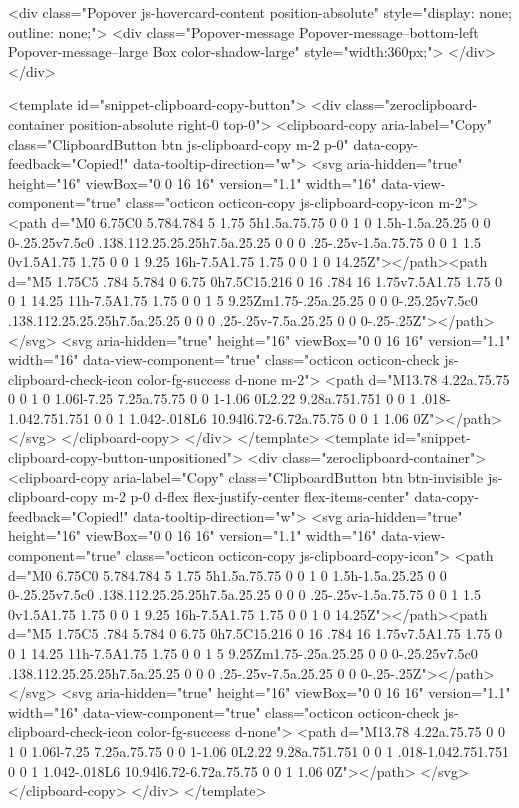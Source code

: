 {{{{{{{    <div class="Popover js-hovercard-content position-absolute" style="display: none; outline: none;">
  <div class="Popover-message Popover-message--bottom-left Popover-message--large Box color-shadow-large" style="width:360px;">
  </div>
</div>

    <template id="snippet-clipboard-copy-button">
  <div class="zeroclipboard-container position-absolute right-0 top-0">
    <clipboard-copy aria-label="Copy" class="ClipboardButton btn js-clipboard-copy m-2 p-0" data-copy-feedback="Copied!" data-tooltip-direction="w">
      <svg aria-hidden="true" height="16" viewBox="0 0 16 16" version="1.1" width="16" data-view-component="true" class="octicon octicon-copy js-clipboard-copy-icon m-2">
    <path d="M0 6.75C0 5.784.784 5 1.75 5h1.5a.75.75 0 0 1 0 1.5h-1.5a.25.25 0 0 0-.25.25v7.5c0 .138.112.25.25.25h7.5a.25.25 0 0 0 .25-.25v-1.5a.75.75 0 0 1 1.5 0v1.5A1.75 1.75 0 0 1 9.25 16h-7.5A1.75 1.75 0 0 1 0 14.25Z"></path><path d="M5 1.75C5 .784 5.784 0 6.75 0h7.5C15.216 0 16 .784 16 1.75v7.5A1.75 1.75 0 0 1 14.25 11h-7.5A1.75 1.75 0 0 1 5 9.25Zm1.75-.25a.25.25 0 0 0-.25.25v7.5c0 .138.112.25.25.25h7.5a.25.25 0 0 0 .25-.25v-7.5a.25.25 0 0 0-.25-.25Z"></path>
</svg>
      <svg aria-hidden="true" height="16" viewBox="0 0 16 16" version="1.1" width="16" data-view-component="true" class="octicon octicon-check js-clipboard-check-icon color-fg-success d-none m-2">
    <path d="M13.78 4.22a.75.75 0 0 1 0 1.06l-7.25 7.25a.75.75 0 0 1-1.06 0L2.22 9.28a.751.751 0 0 1 .018-1.042.751.751 0 0 1 1.042-.018L6 10.94l6.72-6.72a.75.75 0 0 1 1.06 0Z"></path>
</svg>
    </clipboard-copy>
  </div>
</template>
<template id="snippet-clipboard-copy-button-unpositioned">
  <div class="zeroclipboard-container">
    <clipboard-copy aria-label="Copy" class="ClipboardButton btn btn-invisible js-clipboard-copy m-2 p-0 d-flex flex-justify-center flex-items-center" data-copy-feedback="Copied!" data-tooltip-direction="w">
      <svg aria-hidden="true" height="16" viewBox="0 0 16 16" version="1.1" width="16" data-view-component="true" class="octicon octicon-copy js-clipboard-copy-icon">
    <path d="M0 6.75C0 5.784.784 5 1.75 5h1.5a.75.75 0 0 1 0 1.5h-1.5a.25.25 0 0 0-.25.25v7.5c0 .138.112.25.25.25h7.5a.25.25 0 0 0 .25-.25v-1.5a.75.75 0 0 1 1.5 0v1.5A1.75 1.75 0 0 1 9.25 16h-7.5A1.75 1.75 0 0 1 0 14.25Z"></path><path d="M5 1.75C5 .784 5.784 0 6.75 0h7.5C15.216 0 16 .784 16 1.75v7.5A1.75 1.75 0 0 1 14.25 11h-7.5A1.75 1.75 0 0 1 5 9.25Zm1.75-.25a.25.25 0 0 0-.25.25v7.5c0 .138.112.25.25.25h7.5a.25.25 0 0 0 .25-.25v-7.5a.25.25 0 0 0-.25-.25Z"></path>
</svg>
      <svg aria-hidden="true" height="16" viewBox="0 0 16 16" version="1.1" width="16" data-view-component="true" class="octicon octicon-check js-clipboard-check-icon color-fg-success d-none">
    <path d="M13.78 4.22a.75.75 0 0 1 0 1.06l-7.25 7.25a.75.75 0 0 1-1.06 0L2.22 9.28a.751.751 0 0 1 .018-1.042.751.751 0 0 1 1.042-.018L6 10.94l6.72-6.72a.75.75 0 0 1 1.06 0Z"></path>
</svg>
    </clipboard-copy>
  </div>
</template>


}}}}}}}
